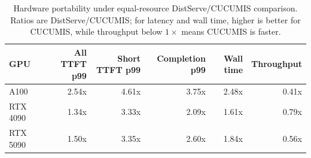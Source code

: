 \begin{table}[t]
\centering
\caption{Hardware portability under equal-resource DistServe/CUCUMIS comparison. Ratios are DistServe/CUCUMIS; for latency and wall time, higher is better for CUCUMIS, while throughput below $1\times$ means CUCUMIS is faster.}
\label{tab:hardware-portability}
\begin{tabular}{lrrrrr}
\toprule
GPU & All TTFT p99 & Short TTFT p99 & Completion p99 & Wall time & Throughput \\
\midrule
A100 & 2.54x & 4.61x & 3.75x & 2.48x & 0.41x \\
RTX 4090 & 1.34x & 3.33x & 2.09x & 1.61x & 0.79x \\
RTX 5090 & 1.50x & 3.35x & 2.60x & 1.84x & 0.56x \\
\bottomrule
\end{tabular}
\end{table}
